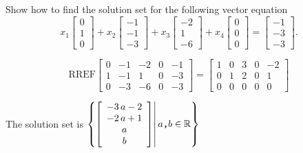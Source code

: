 
\begin{exerciseStatement}


Show how to find the solution set for the following vector equation \[ x_{1} \left[\begin{array}{c}
0 \\
1 \\
0
\end{array}\right] + x_{2} \left[\begin{array}{c}
-1 \\
-1 \\
-3
\end{array}\right] + x_{3} \left[\begin{array}{c}
-2 \\
1 \\
-6
\end{array}\right] + x_{4} \left[\begin{array}{c}
0 \\
0 \\
0
\end{array}\right] = \left[\begin{array}{c}
-1 \\
-3 \\
-3
\end{array}\right] .\]


\end{exerciseStatement}
    
\begin{exerciseAnswer} 
\[\mathrm{RREF} \left[\begin{array}{cccc|c}
0 & -1 & -2 & 0 & -1 \\
1 & -1 & 1 & 0 & -3 \\
0 & -3 & -6 & 0 & -3
\end{array}\right]  =  \left[\begin{array}{cccc|c}
1 & 0 & 3 & 0 & -2 \\
0 & 1 & 2 & 0 & 1 \\
0 & 0 & 0 & 0 & 0
\end{array}\right] \]

The solution set is \( \left\{ \left[\begin{array}{c}
-3 \, a - 2 \\
-2 \, a + 1 \\
a \\
b
\end{array}\right] \middle|\,a\text{\texttt{,}}b\in\mathbb{R}\right\} \)


\end{exerciseAnswer}
    
